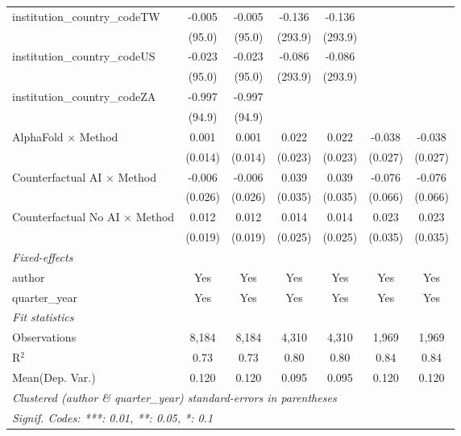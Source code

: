 \begin{tabular}{lcccccc}
   institution\_country\_codeTW          & -0.005        & -0.005        & -0.136        & -0.136        &               &   \\   
                                         & (95.0)        & (95.0)        & (293.9)       & (293.9)       &               &   \\   
   institution\_country\_codeUS          & -0.023        & -0.023        & -0.086        & -0.086        &               &   \\   
                                         & (95.0)        & (95.0)        & (293.9)       & (293.9)       &               &   \\   
   institution\_country\_codeZA          & -0.997        & -0.997        &               &               &               &   \\   
                                         & (94.9)        & (94.9)        &               &               &               &   \\   
   AlphaFold $\times$ Method             & 0.001         & 0.001         & 0.022         & 0.022         & -0.038        & -0.038\\   
                                         & (0.014)       & (0.014)       & (0.023)       & (0.023)       & (0.027)       & (0.027)\\   
   Counterfactual AI $\times$ Method     & -0.006        & -0.006        & 0.039         & 0.039         & -0.076        & -0.076\\   
                                         & (0.026)       & (0.026)       & (0.035)       & (0.035)       & (0.066)       & (0.066)\\   
   Counterfactual No AI $\times$ Method  & 0.012         & 0.012         & 0.014         & 0.014         & 0.023         & 0.023\\   
                                         & (0.019)       & (0.019)       & (0.025)       & (0.025)       & (0.035)       & (0.035)\\   
   \midrule
   \emph{Fixed-effects}\\
   author                                & Yes           & Yes           & Yes           & Yes           & Yes           & Yes\\  
   quarter\_year                         & Yes           & Yes           & Yes           & Yes           & Yes           & Yes\\  
   \midrule
   \emph{Fit statistics}\\
   Observations                          & 8,184         & 8,184         & 4,310         & 4,310         & 1,969         & 1,969\\  
   R$^2$                                 & 0.73          & 0.73          & 0.80          & 0.80          & 0.84          & 0.84\\  
Mean(Dep. Var.) & 0.120 & 0.120 & 0.095 & 0.095 & 0.120 & 0.120 \\
   \midrule \midrule
   \multicolumn{7}{l}{\emph{Clustered (author \& quarter\_year) standard-errors in parentheses}}\\
   \multicolumn{7}{l}{\emph{Signif. Codes: ***: 0.01, **: 0.05, *: 0.1}}\\
\end{tabular}
\par\endgroup
